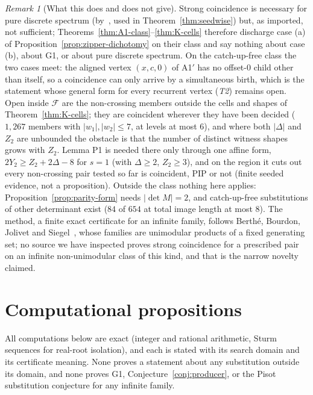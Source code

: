 \documentclass[11pt]{amsart}
\theoremstyle{plain}
\theoremstyle{definition}
\theoremstyle{remark}
\newtheorem{remark}[theorem]{Remark}
\newcommand{\PDS}{pure discrete spectrum}
\begin{document}
\begin{remark}[What this does and does not give]\label{rem:K-scope}
Strong coincidence is necessary for \PDS{} (by~\cite[Cor.~4.5]{AL14}, used in Theorem~\ref{thm:seedwise}) but, as imported, not sufficient; Theorems~\ref{thm:A1-class}--\ref{thm:K-cells} therefore discharge case (a) of Proposition~\ref{prop:zipper-dichotomy} on their class and say nothing about case (b), about G1, or about \PDS{}. On the catch-up-free class the two cases meet: the aligned vertex $(x,c,0)$ of A1$'$ has no offset-$0$ child other than itself, so a coincidence can only arrive by a simultaneous birth, which is the statement whose general form for every recurrent vertex (\emph{T2}) remains open. Open inside $\mathcal F$ are the non-crossing members outside the cells and shapes of Theorem~\ref{thm:K-cells}; they are coincident wherever they have been decided ($1{,}267$ members with $|w_1|,|w_2|\le7$, at levels at most $6$), and where both $|\Delta|$ and $Z_2$ are unbounded the obstacle is that the number of distinct witness shapes grows with $Z_2$. Lemma P1 is needed there only through one affine form, $2Y_2\ge Z_2+2\Delta-8$ for $s=1$ (with $\Delta\ge2$, $Z_2\ge3$), and on the region it cuts out every non-crossing pair tested so far is coincident, PIP or not (finite seeded evidence, not a proposition). Outside the class nothing here applies: Proposition~\ref{prop:parity-form} needs $|\det M|=2$, and catch-up-free substitutions of other determinant exist ($84$ of $654$ at total image length at most $8$). The method, a finite exact certificate for an infinite family, follows Berth\'e, Bourdon, Jolivet and Siegel~\cite{BBJS16}, whose families are unimodular products of a fixed generating set; no source we have inspected proves strong coincidence for a prescribed pair on an infinite non-unimodular class of this kind, and that is the narrow novelty claimed.
\end{remark}

\section{Computational propositions}\label{sec:finite}

All computations below are exact (integer and rational arithmetic, Sturm sequences for real-root isolation), and each is stated with its search domain and its certificate meaning. None proves a statement about any substitution outside its domain, and none proves G1, Conjecture~\ref{conj:producer}, or the Pisot substitution conjecture for any infinite family.
\end{document}
